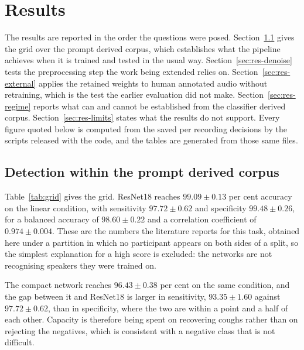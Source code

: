 \section{Results}\label{sec:results}

The results are reported in the order the questions were posed.
Section~\ref{sec:res-grid} gives the grid over the prompt derived corpus, which establishes
what the pipeline achieves when it is trained and tested in the usual way.
Section~\ref{sec:res-denoise} tests the preprocessing step the work being extended relies
on. Section~\ref{sec:res-external} applies the retained weights to human annotated audio
without retraining, which is the test the earlier evaluation did not make.
Section~\ref{sec:res-regime} reports what can and cannot be established from the
classifier derived corpus. Section~\ref{sec:res-limits} states what the results do not
support. Every figure quoted below is computed from the saved per recording decisions by
the scripts released with the code, and the tables are generated from those same files.

\subsection{Detection within the prompt derived corpus}\label{sec:res-grid}

Table~\ref{tab:grid} gives the grid. ResNet18 reaches $99.09 \pm 0.13$ per cent accuracy
on the linear condition, with sensitivity $97.72 \pm 0.62$ and specificity
$99.48 \pm 0.26$, for a balanced accuracy of $98.60 \pm 0.22$ and a correlation
coefficient of $0.974 \pm 0.004$. These are the numbers the literature reports for this
task, obtained here under a partition in which no participant appears on both sides of a
split, so the simplest explanation for a high score is excluded: the networks are not
recognising speakers they were trained on.



The compact network reaches $96.43 \pm 0.38$ per cent on the same condition, and the gap
between it and ResNet18 is larger in sensitivity, $93.35 \pm 1.60$ against
$97.72 \pm 0.62$, than in specificity, where the two are within a point and a half of each
other. Capacity is therefore being spent on recovering coughs rather than on rejecting the
negatives, which is consistent with a negative class that is not difficult.

